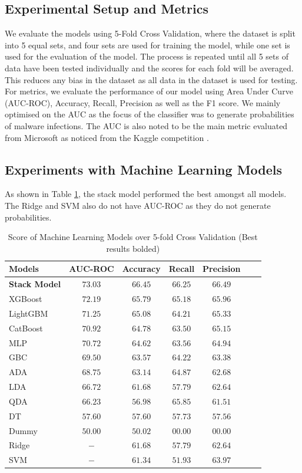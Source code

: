 \documentclass[pdflatex,sn-basic,Numbered]{sn-jnl}%
\theoremstyle{thmstyleone}%
\theoremstyle{thmstyletwo}%
\theoremstyle{thmstylethree}%
\begin{document}
\subsection{Experimental Setup and Metrics}We evaluate the models using 5-Fold Cross Validation, where the dataset is split into 5 equal sets, and four sets are used for training the model, while one set is used for the evaluation of the model. The process is repeated until all 5 sets of data have been tested individually and the scores for each fold will be averaged. This reduces any bias in the dataset as all data in the dataset is used for testing. For metrics, we evaluate the performance of our model using Area Under Curve (AUC-ROC), Accuracy, Recall, Precision as well as the F1 score. We mainly optimised on the AUC as the focus of the classifier was to generate probabilities of malware infections. The AUC is also noted to be the main metric evaluated from Microsoft as noticed from the Kaggle competition \cite{microsoft-malware-prediction}. 


\subsection{Experiments with Machine Learning Models}
As shown in Table \ref{tab:allaimodels}, the stack model performed the best amongst all models. The Ridge and SVM also do not have AUC-ROC as they do not generate probabilities.
\begin{table}
\centering
\caption{Score of Machine Learning Models over 5-fold Cross Validation (Best results bolded)}
\label{tab:allaimodels}
\begin{tabular}{@{}lcccccc@{}}
\toprule
 {\bf Models} & {\bf AUC-ROC} & {\bf Accuracy} & {\bf Recall} & {\bf Precision} \\ \midrule %
 \textbf{Stack Model} & $\mathbf{73.03}$ & $\mathbf{66.45}$ & $\mathbf{66.25}$ & $\mathbf{66.49}$ \\ 
XGBoost & $72.19$ & $65.79$ & $65.18$ & $65.96$ \\
LightGBM & $71.25$ & $65.08$ & $64.21$ & $65.33$ \\ 
CatBoost & $70.92$ & $64.78$ & $63.50$ & $65.15$ \\ 
MLP & $70.72$ & $64.62 $ & $63.56$ & $64.94$ \\ 
GBC & $69.50$ & $63.57 $ & $64.22$ & $63.38$ \\ 
ADA & $68.75$ & $63.14$ & $64.87$ & $62.68$ \\ 
LDA & $66.72$ & $61.68$ & $57.79$ & $62.64$ \\ 
QDA & $66.23$ & $56.98$ & $65.85$ & $61.51$ \\ 
DT & $57.60$ & $57.60$ & $57.73$ & $57.56$ \\ 
Dummy & $50.00$ & $50.02$ & $00.00$ & $00.00$ \\ 
Ridge & $-$ & $61.68$ & $57.79$ & $62.64$ \\
SVM & $-$ & $61.34$ & $51.93$ & $63.97$ \\ \bottomrule
\end{tabular}%
\vspace{-1ex}
\end{table}
\end{document}
